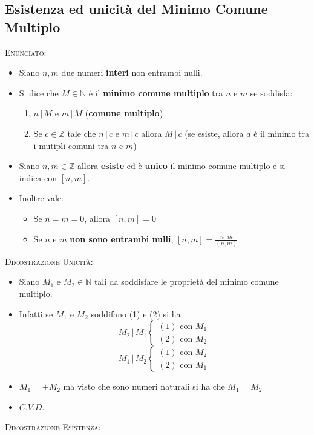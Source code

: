 \documentclass[10pt]{article}
\begin{document}
\subsection{Esistenza ed unicità del Minimo Comune Multiplo}
\textsc{Enunciato:}
\begin{itemize}
\item
Siano $n,m$ due numeri \textbf{interi} non entrambi nulli. 
\item
Si dice che $M \in \mathbb{N}$ è il \textbf{minimo comune multiplo} tra $n$ e $m$ se soddisfa:
\begin{enumerate}
\item
$n \,|\, M$ e $m \,|\, M$ (\textbf{comune multiplo})
\item
Se $c \in \mathbb{Z}$ tale che $n \,|\, c$ e $m \,|\, c$ allora $M \,|\, c$ (se esiste, allora $d$ è il minimo tra i mutipli comuni tra $n$ e $m$)
\end{enumerate}
\item
Siano $n,m \in \mathbb{Z}$ allora \textbf{esiste} ed è \textbf{unico} il minimo comune multiplo e si indica con $\left[n,m\right]$.
\item
Inoltre vale:
\begin{itemize}
\item
Se $n = m = 0$, allora $\left[n,m\right] = 0$
\item
Se $n$ e $m$ \textbf{non sono entrambi nulli}, $\left[n,m\right] = \displaystyle{\frac{n \cdot m}{(n,m)}}$
\end{itemize}
\end{itemize}
\textsc{Dimostrazione Unicità:}
\begin{itemize}
\item
Siano $M_1$ e $M_2 \in \mathbb{N}$ tali da soddisfare le proprietà del minimo comune multiplo.
\item
Infatti se $M_1$ e $M_2$ soddifano (1) e (2) si ha:
\[
M_2 \,|\, M_1
\begin{cases}
(1) \textrm{ con } M_1 \\
(2) \textrm{ con } M_2
\end{cases}
\]
\[
M_1 \,|\, M_2
\begin{cases}
(1) \textrm{ con } M_2\\
(2) \textrm{ con } M_1
\end{cases}
\]
\item
$M_1=\pm M_2$ ma visto che sono numeri naturali si ha che $M_1= M_2$
\item
$C.V.D.$
\end{itemize}
\textsc{Dimostrazione Esistenza:}
\end{document}
